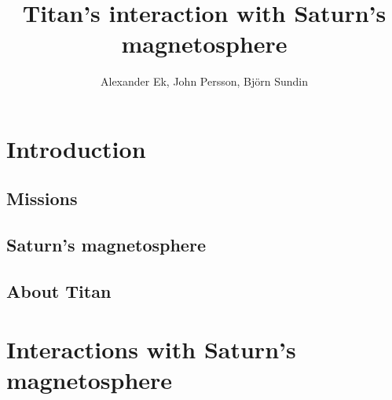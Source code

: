 \documentclass[12pt, titlepage, parskip=full*]{scrartcl}
\title{Titan's interaction with Saturn's magnetosphere}
\author{Alexander Ek, John Persson, Björn Sundin}
\begin{document}
\maketitle

\tableofcontents

\section{Introduction}
\subsection{Missions}
\subsection{Saturn's magnetosphere}
\subsection{About Titan}


\section{Interactions with Saturn's magnetosphere}


\printbibliography
\end{document}
